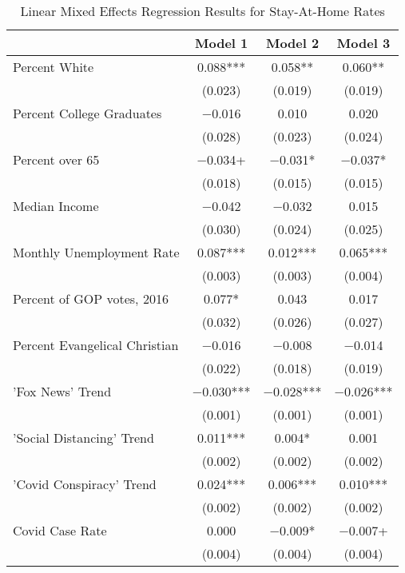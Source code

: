 \begin{table}[!ht]

\caption{\label{tab:google-tab}Linear Mixed Effects Regression Results for Stay-At-Home Rates}
\centering
\fontsize{8}{10}\selectfont
\begin{tabular}{lccc}
\toprule
  & Model 1 & Model 2 & Model 3\\
\midrule
Percent White & \num{0.088}*** & \num{0.058}** & \num{0.060}**\\
 & (\num{0.023}) & (\num{0.019}) & (\num{0.019})\\
Percent College Graduates & \num{-0.016} & \num{0.010} & \num{0.020}\\
 & (\num{0.028}) & (\num{0.023}) & (\num{0.024})\\
Percent over 65 & \num{-0.034}+ & \num{-0.031}* & \num{-0.037}*\\
 & (\num{0.018}) & (\num{0.015}) & (\num{0.015})\\
Median Income & \num{-0.042} & \num{-0.032} & \num{0.015}\\
 & (\num{0.030}) & (\num{0.024}) & (\num{0.025})\\
Monthly Unemployment Rate & \num{0.087}*** & \num{0.012}*** & \num{0.065}***\\
 & (\num{0.003}) & (\num{0.003}) & (\num{0.004})\\
Percent of GOP votes, 2016 & \num{0.077}* & \num{0.043} & \num{0.017}\\
 & (\num{0.032}) & (\num{0.026}) & (\num{0.027})\\
Percent Evangelical Christian & \num{-0.016} & \num{-0.008} & \num{-0.014}\\
 & (\num{0.022}) & (\num{0.018}) & (\num{0.019})\\
'Fox News' Trend & \num{-0.030}*** & \num{-0.028}*** & \num{-0.026}***\\
 & (\num{0.001}) & (\num{0.001}) & \vphantom{1} (\num{0.001})\\
'Social Distancing' Trend & \num{0.011}*** & \num{0.004}* & \num{0.001}\\
 & (\num{0.002}) & (\num{0.002}) & \vphantom{1} (\num{0.002})\\
'Covid Conspiracy' Trend & \num{0.024}*** & \num{0.006}*** & \num{0.010}***\\
 & (\num{0.002}) & (\num{0.002}) & (\num{0.002})\\
Covid Case Rate & \num{0.000} & \num{-0.009}* & \num{-0.007}+\\
 & (\num{0.004}) & (\num{0.004}) & (\num{0.004})\\

\end{tabular}
\end{table}
